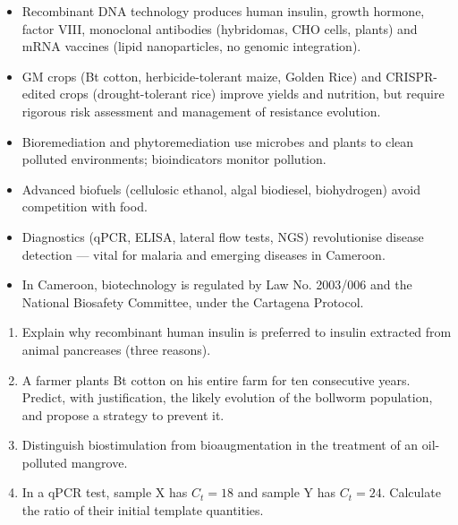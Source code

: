 \documentclass[11pt]{article}
\begin{document}
\begin{aretenir}
\begin{itemize}
\item Recombinant DNA technology produces human insulin, growth hormone, factor VIII, monoclonal antibodies (hybridomas, CHO cells, plants) and mRNA vaccines (lipid nanoparticles, no genomic integration).
\item GM crops (Bt cotton, herbicide-tolerant maize, Golden Rice) and CRISPR-edited crops (drought-tolerant rice) improve yields and nutrition, but require rigorous risk assessment and management of resistance evolution.
\item Bioremediation and phytoremediation use microbes and plants to clean polluted environments; bioindicators monitor pollution.
\item Advanced biofuels (cellulosic ethanol, algal biodiesel, biohydrogen) avoid competition with food.
\item Diagnostics (qPCR, ELISA, lateral flow tests, NGS) revolutionise disease detection --- vital for malaria and emerging diseases in Cameroon.
\item In Cameroon, biotechnology is regulated by Law No. 2003/006 and the National Biosafety Committee, under the Cartagena Protocol.
\end{itemize}
\end{aretenir}

\begin{exercice}
\begin{enumerate}
\item Explain why recombinant human insulin is preferred to insulin extracted from animal pancreases (three reasons).
\item A farmer plants Bt cotton on his entire farm for ten consecutive years. Predict, with justification, the likely evolution of the bollworm population, and propose a strategy to prevent it.
\item Distinguish biostimulation from bioaugmentation in the treatment of an oil-polluted mangrove.
\item In a qPCR test, sample X has $C_t = 18$ and sample Y has $C_t = 24$. Calculate the ratio of their initial template quantities.
\end{enumerate}
\end{exercice}
\end{document}
